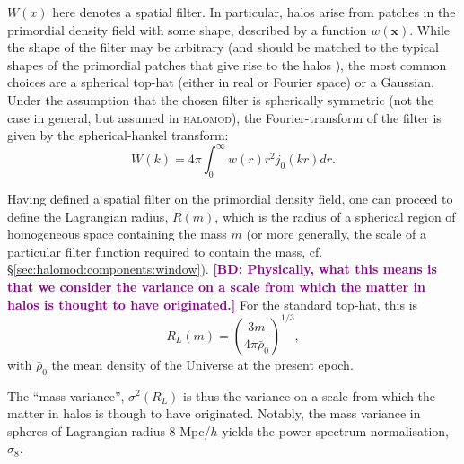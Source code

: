 \documentclass[5p]{elsarticle}
\newcommand{\halomod}{\textsc{halomod}}
\newcommand{\bd}[1]{\textcolor{purple}{\textbf{[BD: #1]}}}
\begin{document}
$W(x)$ here denotes a spatial filter.
In particular, halos arise from patches in the primordial density field with some shape, described by a function $w(\mathbf{x})$.
While the shape of the filter may be arbitrary (and should be matched to the typical shapes of the primordial patches that give rise to the halos \citep{Dalal2010, Chan2017,Diemer2019}), the most common choices are a spherical top-hat (either in real or Fourier space) or a Gaussian.
Under the assumption that the chosen filter is spherically symmetric (not the case in general, but assumed in \halomod), the Fourier-transform of the filter is given by the spherical-hankel transform:
\begin{equation}
    W(k) = 4\pi \int_0^\infty w(r) r^2 j_0(kr) dr.
\end{equation}

Having defined a spatial filter on the primordial density field, one can proceed to define the Lagrangian radius, $R(m)$, which is the radius of a spherical region of homogeneous space containing the mass $m$ (or more generally, the scale of a particular filter function required to contain the mass, cf. \S\ref{sec:halomod:components:window}). \bd{Physically, what this means is that we consider the variance on a scale from which the matter in halos is thought to have originated.} For the standard top-hat, this is
\begin{equation}
    R_L(m) = \left(\frac{3m}{4\pi\bar{\rho}_0}\right)^{1 / 3},
\end{equation}
with $\bar{\rho}_0$ the mean density of the Universe at the present epoch.

The ``mass variance'', $\sigma^2(R_L)$ is thus the variance on a scale from which the matter in halos is though to have originated. Notably, the mass variance in spheres of Lagrangian radius 8 Mpc/$h$ yields the power spectrum normalisation, $\sigma_8$.
\end{document}
